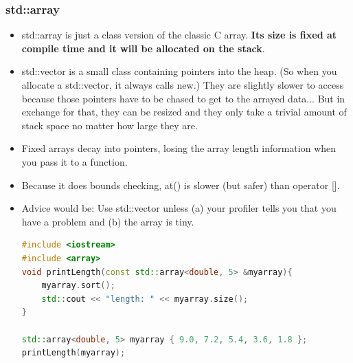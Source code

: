 \documentclass[a4paper,12pt,twoside]{book}
\begin{document}
\subsubsection{std::array}
\begin{itemize}
\item std::array is just a class version of the classic C array. \textbf{Its size is fixed at compile time and it will be allocated  on the stack}.

\item std::vector is a small class containing pointers into the heap. (So when you allocate a std::vector, it always calls new.) They are slightly slower to access because those pointers have to be chased to get to the arrayed data... But in exchange for that, they can be resized and they only take a trivial amount of stack space no matter how large they are.

\item Fixed arrays decay into pointers, losing the array length information when you pass it to a function.

\item Because it does bounds checking, at() is slower (but safer) than operator [].

\item Advice would be: Use std::vector unless (a) your profiler tells you that you have a problem and (b) the array is tiny.
\begin{lstlisting}[frame=single, language=c++]
#include <iostream>
#include <array>
void printLength(const std::array<double, 5> &myarray){
    myarray.sort();
    std::cout << "length: " << myarray.size();
}

std::array<double, 5> myarray { 9.0, 7.2, 5.4, 3.6, 1.8 };
printLength(myarray);
\end{lstlisting}
\end{itemize}
\end{document}
